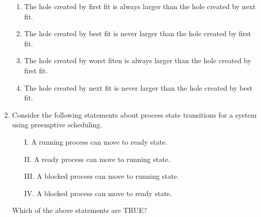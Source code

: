 \documentclass[journal,12pt,onecolumn]{IEEEtran}
\theoremstyle{remark}
\begin{document}
\begin{enumerate}
	\hfill{}
	\begin{enumerate}
		\item The hole created by first fit is always larger than the hole created by next fit.
		\item The hole created by best fit is never larger than the hole created by first fit.
		\item The hole created by worst fiten is always larger than the hole created by first fit.
		\item The hole created by next fit is never larger than the hole created by best fit.
	\end{enumerate}
	
	\item Consider the following statements about process state transitions for a system using preemptive scheduling.

	
	\begin{enumerate}
		\item[I.] A running process can move to ready state.
		\item[II.] A ready process can move to running state.
		\item[III.] A blocked process can move to running state.
		\item[IV.] A blocked process can move to ready state.
	\end{enumerate}
	Which of the above statements are TRUE?
	
	\hfill{}
	\begin{enumerate}
	\end{enumerate}
	

\end{enumerate}
\end{document}
